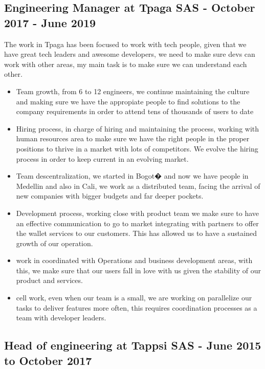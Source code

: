 \documentclass{article}
\begin{document}
\subsection{Engineering Manager at Tpaga SAS - October 2017 - June 2019}
\label{sec:tpaga}

The work in Tpaga has been focused to work with tech people, given
that we have great tech leaders and awesome developers, we need to
make sure devs can work with other areas, my main task is to make
sure we can understand each other.

\begin{itemize}
\item Team growth, from 6 to 12 engineers, we continue maintaining the culture and making sure we have the appropiate people to find solutions to the company requirements in order to attend tens of thousands of users to date
\item Hiring process, in charge of hiring and maintaining the process, working with human resources area to make sure we have the right people in the proper positions to thrive in a market with lots of competitors. We evolve the hiring process in order to keep current in an evolving market.
\item Team descentralization, we started in Bogot� and now we have people in Medellin and also in Cali, we work as a distributed team, facing the arrival of new companies with bigger budgets and far deeper pockets.
\item Development process, working close with product team we make sure to have an effective communication to go to market integrating with partners to offer the wallet services to our customers.  This has allowed us to have a sustained growth of our operation.
\item work in coordinated with Operations and business development areas, with this, we make sure that our users fall in love with us given the stability of our product and services.
\item cell work, even when our team is a small, we are working on parallelize our tasks to deliver features more often, this requires coordination processes as a team with developer leaders.
\end{itemize}

\subsection{Head of engineering at Tappsi SAS - June 2015 to October 2017}
\label{sec:tappsi}
\end{document}
